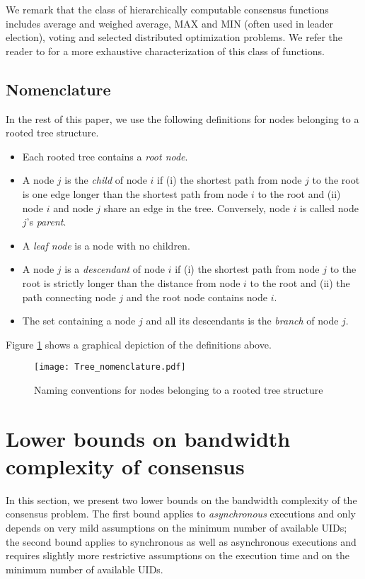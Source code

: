\documentclass[letterpaper,10pt,conference]{ieeeconf}
\begin{document}
We remark that the class of hierarchically computable consensus functions includes average and weighed average, MAX and MIN (often used in leader election), voting and selected distributed optimization problems. We refer the reader to \cite{FR-MP:14a} for a more exhaustive characterization of this class of functions. 

\subsection{Nomenclature}
In the rest of this paper, we use the following definitions for nodes belonging to a rooted tree structure.
\begin{itemize}
\item Each rooted tree contains a \emph{root node}.
\item A node $j$ is the \emph{child} of node $i$ if (i) the shortest path from node $j$ to the root is one edge longer than the shortest path from node $i$ to the root and (ii) node $i$ and node $j$ share an edge in the tree. Conversely, node $i$ is called node $j$'s \emph{parent}.
\item A \emph{leaf node} is a node with no children.
\item A node $j$ is a \emph{descendant} of node $i$ if (i)  the shortest path from node $j$ to the root is strictly longer than the distance from node $i$ to the root and (ii) the path connecting node $j$ and the root node contains node $i$.
\item The set containing a node $j$ and all its descendants is the \emph{branch} of node $j$. 
\end{itemize}
Figure \ref{fig:treenomenclature} shows a graphical depiction of the definitions above.
\begin{figure}[h]
\centering
\texttt{[image: Tree\_nomenclature.pdf]}
\caption{Naming conventions for nodes belonging to a rooted tree structure}
\label{fig:treenomenclature}
\end{figure}

\section{Lower bounds on bandwidth complexity of consensus}
\label{sec:lbs}
In this section, we present two lower bounds on the bandwidth complexity of the consensus problem. The first bound applies to \emph{asynchronous} executions and only depends on very mild assumptions on the minimum number of available UIDs; the second bound applies to synchronous as well as asynchronous executions and requires slightly more restrictive assumptions on the execution time and on the minimum number of available UIDs. 
\end{document}
